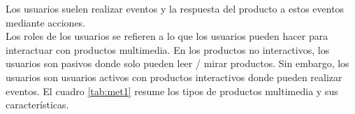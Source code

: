 Los usuarios suelen realizar eventos y la respuesta del producto a estos eventos mediante acciones.\\
Los roles de los usuarios se refieren a lo que los usuarios pueden hacer para interactuar con productos multimedia. En los productos no interactivos, los usuarios son pasivos donde 
solo pueden leer / mirar productos. Sin embargo, los usuarios son usuarios activos con productos interactivos donde pueden realizar eventos. El cuadro \ref{tab:met1}  resume los tipos de productos 
multimedia y sus características.
\begin{table}[H]
  \caption{Características de los productos multimedia.
  }
  \label{tab:met1}
  \end{table}

